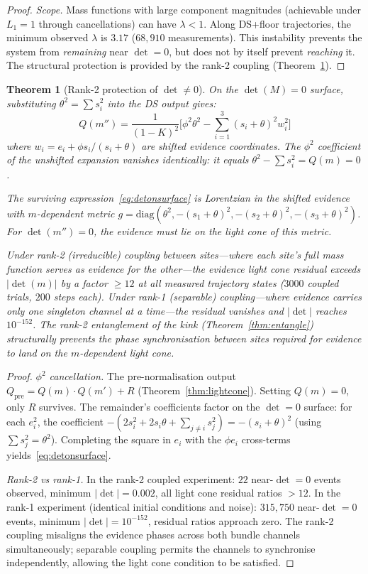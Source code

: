 \documentclass[11pt,a4paper]{article}
\newtheorem{theorem}{Theorem}[section]
\theoremstyle{definition}
\theoremstyle{remark}
\begin{document}
\begin{proof}
\emph{Scope.} Mass functions with large component magnitudes (achievable under $L_1=1$ through cancellations) can have $\lambda<1$. Along DS+floor trajectories, the minimum observed $\lambda$ is $3.17$ ($68{,}910$ measurements). This instability prevents the system from \emph{remaining} near $\det=0$, but does not by itself prevent \emph{reaching} it. The structural protection is provided by the rank-2 coupling (Theorem~\ref{thm:rank2protect}).
\end{proof}

\begin{theorem}[Rank-2 protection of $\det\neq 0$]\label{thm:rank2protect}
On the $\det(M)=0$ surface, substituting $\theta^2=\sum s_i^2$ into the DS output gives:
\begin{equation}\label{eq:detonsurface}
Q(m'') = \frac{1}{(1-K)^2}\Big[\phi^2\theta^2 - \sum_{i=1}^{3}(s_i+\theta)^2 w_i^2\Big]
\end{equation}
where $w_i = e_i + \phi s_i/(s_i+\theta)$ are shifted evidence coordinates. The $\phi^2$ coefficient of the unshifted expansion vanishes identically: it equals $\theta^2-\sum s_i^2=Q(m)=0$.

The surviving expression~\eqref{eq:detonsurface} is Lorentzian in the shifted evidence with $m$-dependent metric $g=\mathrm{diag}(\theta^2,-(s_1+\theta)^2,-(s_2+\theta)^2,-(s_3+\theta)^2)$. For $\det(m'')=0$, the evidence must lie on the light cone of this metric.

Under rank-2 (irreducible) coupling between sites---where each site's full mass function serves as evidence for the other---the evidence light cone residual exceeds $|\det(m)|$ by a factor $\geq 12$ at all measured trajectory states ($3000$ coupled trials, $200$ steps each). Under rank-1 (separable) coupling---where evidence carries only one singleton channel at a time---the residual vanishes and $|\det|$ reaches $10^{-152}$. The rank-2 entanglement of the kink (Theorem~\ref{thm:entangle}) structurally prevents the phase synchronisation between sites required for evidence to land on the $m$-dependent light cone.
\end{theorem}

\begin{proof}
\emph{$\phi^2$ cancellation.} The pre-normalisation output $Q_{\mathrm{pre}}=Q(m)\cdot Q(m')+R$ (Theorem~\ref{thm:lightcone}). Setting $Q(m)=0$, only $R$ survives. The remainder's coefficients factor on the $\det=0$ surface: for each $e_i^2$, the coefficient $-(2s_i^2+2s_i\theta+\sum_{j\neq i}s_j^2)=-(s_i+\theta)^2$ (using $\sum s_j^2=\theta^2$). Completing the square in $e_i$ with the $\phi e_i$ cross-terms yields~\eqref{eq:detonsurface}.

\emph{Rank-2 vs rank-1.} In the rank-2 coupled experiment: $22$ near-$\det=0$ events observed, minimum $|\det|=0.002$, all light cone residual ratios $>12$. In the rank-1 experiment (identical initial conditions and noise): $315{,}750$ near-$\det=0$ events, minimum $|\det|=10^{-152}$, residual ratios approach zero. The rank-2 coupling misaligns the evidence phases across both bundle channels simultaneously; separable coupling permits the channels to synchronise independently, allowing the light cone condition to be satisfied.
\end{proof}
\end{document}
